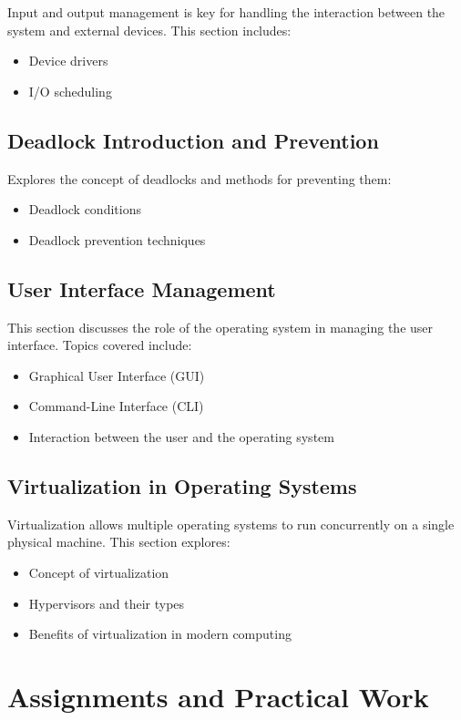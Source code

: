 \documentclass[12pt]{article}
\begin{document}
Input and output management is key for handling the interaction between the system and external devices. This section includes:
\begin{itemize}
    \item Device drivers
    \item I/O scheduling
\end{itemize}

\subsection{Deadlock Introduction and Prevention}
Explores the concept of deadlocks and methods for preventing them:
\begin{itemize}
    \item Deadlock conditions
    \item Deadlock prevention techniques
\end{itemize}

\subsection{User Interface Management}
This section discusses the role of the operating system in managing the user interface. Topics covered include:
\begin{itemize}
    \item Graphical User Interface (GUI)
    \item Command-Line Interface (CLI)
    \item Interaction between the user and the operating system
\end{itemize}

\subsection{Virtualization in Operating Systems}
Virtualization allows multiple operating systems to run concurrently on a single physical machine. This section explores:
\begin{itemize}
    \item Concept of virtualization
    \item Hypervisors and their types
    \item Benefits of virtualization in modern computing
\end{itemize}

\section{Assignments and Practical Work}
\end{document}
